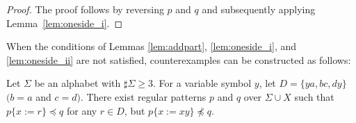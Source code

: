 \begin{proof}
The proof follows by reversing $p$ and $q$ and subsequently applying Lemma~\ref{lem:oneside_i}.
\end{proof}

When the conditions of Lemmas \ref{lem:addpart}, \ref{lem:oneside_i}, and \ref{lem:oneside_ii} are not satisfied, counterexamples can be constructed as follows:

\begin{prop}\label{prop:bothsides}
  Let $\Sigma$ be an alphabet with $\sharp \Sigma \ge 3$.
  For a variable symbol $y$, let $D= \{ ya, bc, dy \}$ $(b = a$ and $c = d)$.
  There exist regular patterns $p$ and $q$ {\color{red}over} $\Sigma\cup X$ such that $p \{ x := r \} \preceq q$ for any $r \in D$, but $p \{ x := xy \} \not \preceq q$.
\end{prop}

